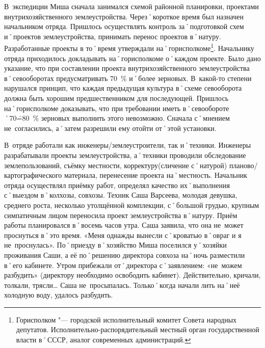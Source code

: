 В~экспедиции Миша сначала занимался схемой районной планировки, проектами внутрихозяйственного землеустройства. Через˚короткое время был назначен начальником отряда. Пришлось осуществлять контроль за˚подготовкой схем и˚проектов землеустройства, принимать перенос проектов в˚натуру. Разработанные проекты в то˚время утверждали на˚горисполкоме\footnote{Горисполком "--- городской исполнительный комитет Совета народных депутатов. Исполнительно-распорядительный местный орган государственной власти в˚СССР, аналог современных администраций.}. Начальнику отряда приходилось докладывать на˚горисполкоме о˚каждом проекте. Было дано указание, что при составлении проекта внутрихозяйственного землеустройства в˚севооборотах предусматривать 70~\% и˚более зерновых. В~какой-то степени нарушался принцип, что каждая предыдущая культура в˚схеме севооборота должна быть хорошим предшественником для последующей. Пришлось на˚горисполкоме доказывать, что при требовании иметь в˚севообороте ˚70\==80~\% зерновых выполнить этого невозможно. Сначала с˚мнением не~согласились, а˚затем разрешили ему отойти от˚этой установки.

В~отряде работали как инженеры\-/землеустроители, так и˚техники. Инженеры разрабатывали проекты землеустройства, а˚техники проводили обследование землепользований, съёмку местности, корректуру(сличение с˚натурой) планово\-/картографического материала, перенесение проекта на˚местность. Начальник отряда осуществлял приёмку работ, определял качество их˚выполнения с˚выездом в˚колхозы, совхозы. Техник Саша Варсеева, молодая девушка, среднего роста, несколько утолщённой комплекции, с˚большой грудью, крупным симпатичным лицом переносила проект землеустройства в˚натуру. Приём работы планировался в˚восемь часов утра. Саша заявила, что она не~может проснуться в˚это время.  «Меня однажды вынесли с˚кроватью в˚овраг и я не~проснулась». По˚приезду в˚хозяйство Миша поселился у˚хозяйки проживания Саши, а её по˚решению директора совхоза на˚ночь разместили в˚его кабинете. Утром прибежали от˚директора с˚заявлением: «не~можем разбудить» (директору необходимо освободить кабинет). Действительно, кричали, толкали, трясли… Саша не~просыпалась. Только˚когда начали лить на˚неё холодную воду, удалось разбудить.

